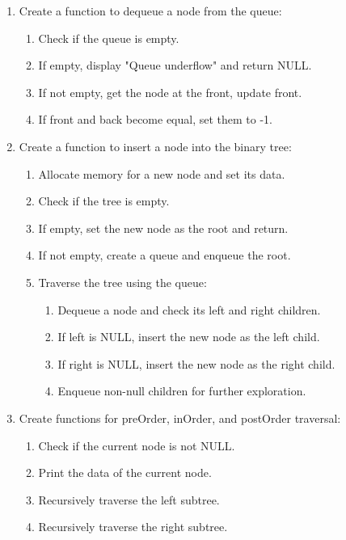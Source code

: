 {\begin{enumerate}[label=\arabic*.]
    \item Create a function to dequeue a node from the queue:
          \begin{enumerate}[label=\arabic{enumi}.\arabic*.]
            \item Check if the queue is empty.
            \item If empty, display "Queue underflow" and return NULL.
            \item If not empty, get the node at the front, update front.
            \item If front and back become equal, set them to -1.
          \end{enumerate}

    \item Create a function to insert a node into the binary tree:
          \begin{enumerate}[label=\arabic{enumi}.\arabic*.]
            \item Allocate memory for a new node and set its data.
            \item Check if the tree is empty.
            \item If empty, set the new node as the root and return.
            \item If not empty, create a queue and enqueue the root.
            \item Traverse the tree using the queue:
                  \begin{enumerate}[label=\arabic{enumi}.\arabic{enumii}.\arabic*.]
                    \item Dequeue a node and check its left and right children.
                    \item If left is NULL, insert the new node as the left child.
                    \item If right is NULL, insert the new node as the right child.
                    \item Enqueue non-null children for further exploration.
                  \end{enumerate}
          \end{enumerate}

    \item Create functions for preOrder, inOrder, and postOrder traversal:
          \begin{enumerate}[label=\arabic{enumi}.\arabic*.]
            \item Check if the current node is not NULL.
            \item Print the data of the current node.
            \item Recursively traverse the left subtree.
            \item Recursively traverse the right subtree.
          \end{enumerate}


\end{enumerate}}
